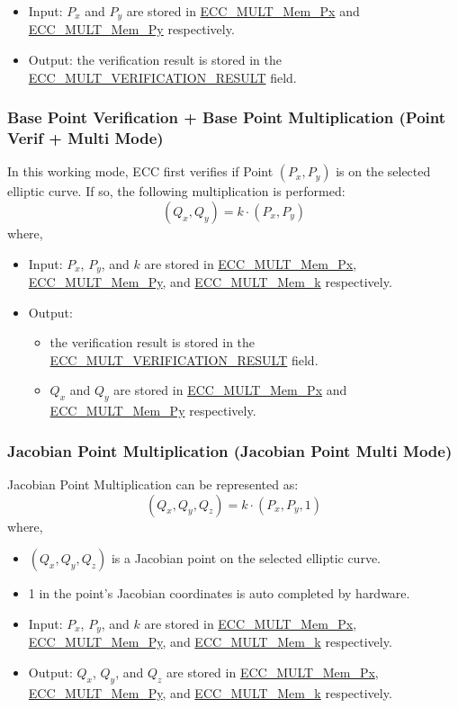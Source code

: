 \documentclass[main\_\_EN.tex]{subfiles}
\begin{document}
\begin{itemize}
    \item Input: $P_x$ and $P_y$ are stored in \hyperref[tab:ecc-memory]{ECC\_MULT\_Mem\_Px} and \hyperref[tab:ecc-memory]{ECC\_MULT\_Mem\_Py} respectively.
    \item Output: the verification result is stored in the \hyperref[fielddesc:ECCMULTVERIFICATIONRESULT]{ECC\_MULT\_VERIFICATION\_RESULT} field.
\end{itemize}

\subsubsection{Base Point Verification + Base Point Multiplication (Point Verif + Multi Mode)}

In this working mode, ECC first verifies if Point $(P_x,P_y)$ is on the selected elliptic curve. If so, the following multiplication is performed:
\[
(Q_x,Q_y) = k \cdot (P_x,P_y)
\]
where, 
\begin{itemize}
    \item Input: $P_x$, $P_y$, and $k$ are stored in \hyperref[tab:ecc-memory]{ECC\_MULT\_Mem\_Px}, \hyperref[tab:ecc-memory]{ECC\_MULT\_Mem\_Py}, and \hyperref[tab:ecc-memory]{ECC\_MULT\_Mem\_k} respectively.
    \item Output: 
    \begin{itemize}
        \item the verification result is stored in the \hyperref[fielddesc:ECCMULTVERIFICATIONRESULT]{ECC\_MULT\_VERIFICATION\_RESULT} field.
        \item $Q_x$ and $Q_y$ are stored in \hyperref[tab:ecc-memory]{ECC\_MULT\_Mem\_Px} and \hyperref[tab:ecc-memory]{ECC\_MULT\_Mem\_Py} respectively.
    \end{itemize}
\end{itemize}

\subsubsection{Jacobian Point Multiplication (Jacobian Point Multi Mode)}

Jacobian Point Multiplication can be represented as: 
\[
(Q_x,Q_y,Q_z) = k \cdot (P_x,P_y,1)
\]
where, 
\begin{itemize}
    \item $(Q_x,Q_y,Q_z)$ is a Jacobian point on the selected elliptic curve.
    \item 1 in the point's Jacobian coordinates is auto completed by hardware. 
    \item Input: $P_x$, $P_y$, and $k$ are stored in \hyperref[tab:ecc-memory]{ECC\_MULT\_Mem\_Px}, \hyperref[tab:ecc-memory]{ECC\_MULT\_Mem\_Py}, and \hyperref[tab:ecc-memory]{ECC\_MULT\_Mem\_k} respectively.
    \item Output: $Q_x$, $Q_y$, and $Q_z$ are stored in \hyperref[tab:ecc-memory]{ECC\_MULT\_Mem\_Px}, \hyperref[tab:ecc-memory]{ECC\_MULT\_Mem\_Py}, and \hyperref[tab:ecc-memory]{ECC\_MULT\_Mem\_k} respectively.
\end{itemize}
\end{document}
